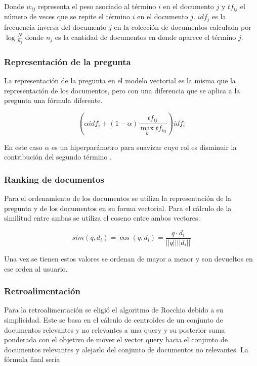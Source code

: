 \documentclass[runningheads]{llncs}
\begin{document}
Donde $w_{ij}$ representa el peso asociado al término $i$ en el documento $j$ y $tf_{ij}$ el número de veces que
se repite el término $i$ en el documento $j$. $idf_{j}$ es la frecuencia inversa del documento $j$ en la
colección de documentos calculada por $\log{\frac{N}{n_j}}$ donde $n_j$ es la cantidad de documentos
en donde aparece el término $j$.

\subsubsection{Representación de la pregunta}

La representación de la pregunta en el modelo vectorial es la misma que la representación de los 
documentos, pero con una diferencia que se aplica a la pregunta una fórmula diferente.

\begin{equation}
    (\alpha idf_i + (1-\alpha)\frac{tf_{ij}}{\max_{k} tf_{kj}}) idf_i
\end{equation}

En este caso $\alpha$ es un hiperparámetro para suavizar cuyo rol es disminuir
la contribución del segundo término \cite{alphaManning}.

\subsubsection{Ranking de documentos}

Para el ordenamiento de los documentos se utiliza la representación de la pregunta y de los documentos
en su forma vectorial. Para el cálculo de la similitud entre ambas se utiliza el coseno entre
ambos vectores:

\begin{equation}
    sim(q,d_i) = \cos(q, d_i) = \frac{q \cdot d_i}{||q|| ||d_i||}
\end{equation}

Una vez se tienen estos valores se ordenan de mayor a menor y son devueltos en ese orden al
usuario.

\subsubsection{Retroalimentación}

Para la retroalimentación se eligió el algoritmo de Rocchio debido a su simplicidad. Este se basa 
en el cálculo de centroides de un conjunto de documentos relevantes y no relevantes a una query
y su posterior suma ponderada con el objetivo de mover el vector query hacia el conjunto de 
documentos relevantes y alejarlo del conjunto de documentos no relevantes. La fórmula final sería
\end{document}
